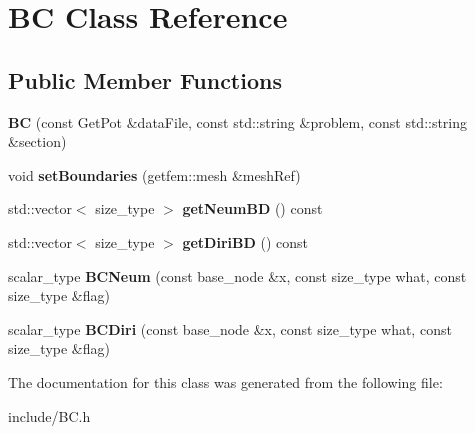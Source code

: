 \hypertarget{classBC}{}\section{BC Class Reference}
\label{classBC}
\subsection*{Public Member Functions}
\begin{DoxyCompactItemize}
\item 
\mbox{\label{classBC_a649dc10a83ab3fa696a17b28c2c12623}} 
{\bfseries BC} (const Get\+Pot \&data\+File, const std\+::string \&problem, const std\+::string \&section)
\item 
\mbox{\label{classBC_a27a056716478adebe4e35c9bac270f92}} 
void {\bfseries set\+Boundaries} (getfem\+::mesh \&mesh\+Ref)
\item 
\mbox{\label{classBC_a047d12487d15077f4f309f346ae30c64}} 
std\+::vector$<$ size\+\_\+type $>$ {\bfseries get\+Neum\+BD} () const
\item 
\mbox{\label{classBC_a48fdb2ed8fd73b082636af6e835c4fa7}} 
std\+::vector$<$ size\+\_\+type $>$ {\bfseries get\+Diri\+BD} () const
\item 
\mbox{\label{classBC_af50f436f390056c8a4c062c5376db48b}} 
scalar\+\_\+type {\bfseries B\+C\+Neum} (const base\+\_\+node \&x, const size\+\_\+type what, const size\+\_\+type \&flag)
\item 
\mbox{\label{classBC_a50c34e6e8a954d6625ffd4b27d58e554}} 
scalar\+\_\+type {\bfseries B\+C\+Diri} (const base\+\_\+node \&x, const size\+\_\+type what, const size\+\_\+type \&flag)
\end{DoxyCompactItemize}


The documentation for this class was generated from the following file\+:\begin{DoxyCompactItemize}
\item 
include/B\+C.\+h\end{DoxyCompactItemize}
